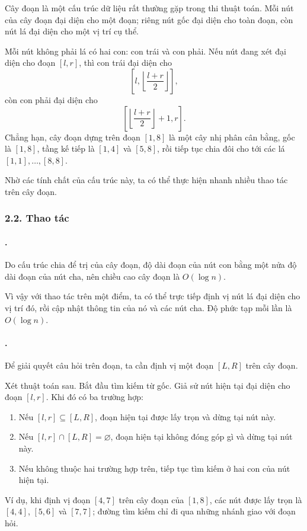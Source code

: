 \documentclass[11pt]{article}
\begin{document}
Cây đoạn là một cấu trúc dữ liệu rất thường gặp trong thi thuật toán. Mỗi nút
của cây đoạn đại diện cho một đoạn; riêng nút gốc đại diện cho toàn đoạn, còn
nút lá đại diện cho một vị trí cụ thể.

Mỗi nút không phải lá có hai con: con trái và con phải. Nếu nút đang xét đại
diện cho đoạn \([l,r]\), thì con trái đại diện cho
\[
  \left[l,\left\lfloor\frac{l+r}{2}\right\rfloor\right],
\]
còn con phải đại diện cho
\[
  \left[\left\lfloor\frac{l+r}{2}\right\rfloor+1,r\right].
\]
Chẳng hạn, cây đoạn dựng trên đoạn \([1,8]\) là một cây nhị phân cân bằng,
gốc là \([1,8]\), tầng kế tiếp là \([1,4]\) và \([5,8]\), rồi tiếp tục chia
đôi cho tới các lá \([1,1],\ldots,[8,8]\).

Nhờ các tính chất của cấu trúc này, ta có thể thực hiện nhanh nhiều thao tác
trên cây đoạn.

\subsubsection*{2.2. Thao tác}

\paragraph{.}
Do cấu trúc chia để trị của cây đoạn, độ dài đoạn của nút con bằng một nửa
độ dài đoạn của nút cha, nên chiều cao cây đoạn là \(O(\log n)\).

Vì vậy với thao tác trên một điểm, ta có thể trực tiếp định vị nút lá đại
diện cho vị trí đó, rồi cập nhật thông tin của nó và các nút cha. Độ phức tạp
mỗi lần là \(O(\log n)\).

\paragraph{.}
Để giải quyết câu hỏi trên đoạn, ta cần định vị một đoạn \([L,R]\) trên cây
đoạn.

Xét thuật toán sau. Bắt đầu tìm kiếm từ gốc. Giả sử nút hiện tại đại diện cho
đoạn \([l,r]\). Khi đó có ba trường hợp:
\begin{enumerate}
  \item Nếu \([l,r]\subseteq [L,R]\), đoạn hiện tại được lấy trọn và dừng tại
  nút này.
  \item Nếu \([l,r]\cap [L,R]=\varnothing\), đoạn hiện tại không đóng góp gì
  và dừng tại nút này.
  \item Nếu không thuộc hai trường hợp trên, tiếp tục tìm kiếm ở hai con của
  nút hiện tại.
\end{enumerate}
Ví dụ, khi định vị đoạn \([4,7]\) trên cây đoạn của \([1,8]\), các nút được
lấy trọn là \([4,4]\), \([5,6]\) và \([7,7]\); đường tìm kiếm chỉ đi qua
những nhánh giao với đoạn hỏi.
\end{document}

